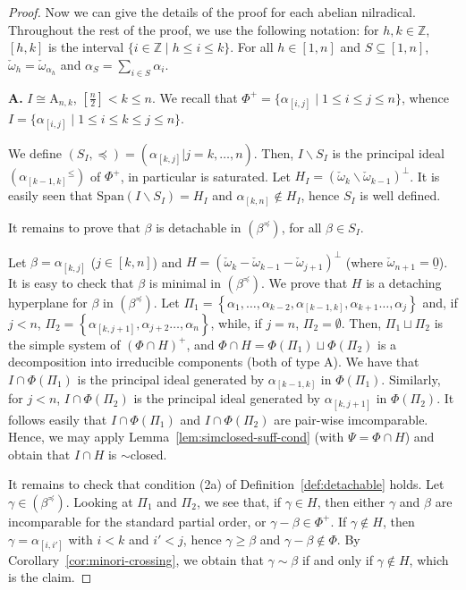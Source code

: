 \documentclass[10pt]{amsart}
\theoremstyle{definition}
\theoremstyle{remark}
\newcommand\nl{\par\noindent}
\newcommand\smeno{\smallsetminus}
\newcommand\nullvec{\underline 0}
\newcommand\ganz{\mathbb Z}
\newcommand\gen{\mathrm{Span}}
\newcommand\al{\alpha}
\newcommand\be{\beta}
\newcommand\ga{\gamma}
\newcommand\preq{\preccurlyeq}
\renewcommand{\leq}{\leqslant}
\begin{document}
\begin{proof}
Now we can give the details of the proof for each abelian nilradical.
Throughout the rest of the proof, we use the following notation: for $h, k\in \ganz$, $[h,k]$ is the interval  $\{i\in \ganz\mid h\leq i\leq k\}$. 
For all $h\in [1,n]$ and  $S\subseteq [1, n]$,  $\check\omega_h=\check\omega_{\al_h}$ and  $\al_{S}=\sum\limits_{i\in S}\al_i$.


\nl 
{\bf A.} $I\cong \mathrm A_{n, k}$, $\left[\frac{n}{2}\right]< k\leq n$. We recall that $\Phi^+=\{\al_{[i, j]}\mid 1\leq i\leq j\leq n\}$, whence $I=\{\al_{[i, j]}\mid 1\leq i\leq k\leq j\leq n\}$.

\par
We define $(S_I, \preq) =\left(\al_{[k,j]}| j=k, \dots, n\right)$.
Then, $I\smeno S_I$ is the principal ideal $({\al_{[k-1, k]}}^\leq)$ of $\Phi^+$, in particular is saturated.
Let $H_I=(\check\omega_k\smeno \check\omega_{k-1})^\perp$. 
It is easily seen that $\gen(I\smeno S_I)=H_I$ and 
$\al_{[k,n]} \not\in H_I$, hence $S_I$ is well defined.

\par
It remains to prove that $\be$ is detachable in  $(\be^\preq)$, for all $\be\in S_I$.

\par
Let $\be=\al_{[k,j]}$ ($j\in[k,n]$) and $H=(\check\omega_k-\check\omega_{k-1}-\check\omega_{j+1})^\perp$ (where $\check\omega_{n+1}=\nullvec$). 
It is easy to check that  $\be$ is minimal in  $(\be^\preq)$.
We prove that $H$ is a detaching hyperplane for $\be$ in  $(\be^\preq)$. 
Let $\Pi_1=\left\{\al_1, \dots, \al_{k-2}, \al_{[k-1,k]}, \al_{k+1}\dots, \al_j\right\}$ and,  if $j< n$, $\Pi_2= \left\{\al_{[k, j+1]}, \al_{j+2}\dots, \al_n\right\}$, while, if $j=n$, $\Pi_2=\emptyset$.
Then, $\Pi_1\sqcup\Pi_2$ is the simple system of $(\Phi\cap H)^+$, 
and $\Phi\cap H=\Phi(\Pi_1)\sqcup \Phi(\Pi_2)$ is a decomposition into irreducible components (both of type $\mathrm A$).
We have that $I\cap \Phi(\Pi_1)$ is the principal ideal generated by $\al_{[k-1,k]}$ in $\Phi(\Pi_1)$.
Similarly, for $j<n$, $I\cap \Phi(\Pi_2)$ is the principal ideal generated by $\al_{[k,j+1]}$ in $\Phi(\Pi_2)$.
It follows easily that $I\cap \Phi(\Pi_1)$ and $I\cap \Phi(\Pi_2)$
are pair-wise imcomparable.
Hence, we may apply Lemma~\ref{lem:simclosed-suff-cond} (with $\Psi=\Phi\cap H$) and  obtain that $I\cap H$ is $\sim$closed.
\par

It remains to check that condition (2a) of Definition~\ref{def:detachable} holds. 
Let $\ga\in (\be^\preq)$.
Looking at $\Pi_1$ and $\Pi_2$, we see that, if $\ga\in H$, then either $\ga$ and $\be$ are incomparable for the standard partial order,  or $\ga-\be\in \Phi^+$. 
	If $\ga\not\in H$, then $\ga=\al_{[i, i']}$ with $i<k$ and $i'<j$, hence $\ga\geq \be$ and $\ga-\be\not\in \Phi$.
By Corollary~\ref{cor:minori-crossing}, we obtain that $\ga\sim \be$ if and only if $\ga\not\in H$, which is the claim.



\end{proof}
\end{document}
